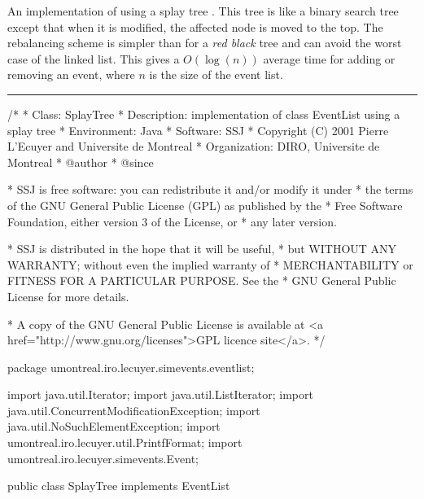
An implementation of  using a splay tree \cite{iSLE85a}.
This tree is like a binary search tree except that when it
is modified, the affected node is moved to the top.
The rebalancing scheme is simpler than for a \emph{red black}
tree and can avoid the worst case of the linked list.
This gives a $O(\log (n))$ average time for adding or removing
an event, where $n$ is the size of the event list.

\bigskip\hrule

\begin{code}
\begin{hide}
/*
 * Class:        SplayTree
 * Description:  implementation of class EventList using a splay tree 
 * Environment:  Java
 * Software:     SSJ 
 * Copyright (C) 2001  Pierre L'Ecuyer and Universite de Montreal
 * Organization: DIRO, Universite de Montreal
 * @author       
 * @since

 * SSJ is free software: you can redistribute it and/or modify it under
 * the terms of the GNU General Public License (GPL) as published by the
 * Free Software Foundation, either version 3 of the License, or
 * any later version.

 * SSJ is distributed in the hope that it will be useful,
 * but WITHOUT ANY WARRANTY; without even the implied warranty of
 * MERCHANTABILITY or FITNESS FOR A PARTICULAR PURPOSE.  See the
 * GNU General Public License for more details.

 * A copy of the GNU General Public License is available at
   <a href="http://www.gnu.org/licenses">GPL licence site</a>.
 */
\end{hide}
package umontreal.iro.lecuyer.simevents.eventlist; \begin{hide}

import java.util.Iterator;
import java.util.ListIterator;
import java.util.ConcurrentModificationException;
import java.util.NoSuchElementException;
import umontreal.iro.lecuyer.util.PrintfFormat;
import umontreal.iro.lecuyer.simevents.Event;
\end{hide}

public class SplayTree implements EventList\begin{hide} {
   private Entry root = null;
   private static Entry free = null;
   private int modCount = 0;

   private int myCompareTo (Event ev, Event other) {
      // A new event must always occur after those with the same time and
      // same priority in the Event list. getRa is used to ensure that.
      int j = ev.compareTo(other);
      if (0 != j)
         return j;
      if (ev.getRa() < other.getRa())
         return -1;
      if (ev.getRa() > other.getRa())
         return 1;
      return 0;
   }\end{hide}
\end{code}\begin{hide}\begin{code}


\end{code}
\end{hide}

